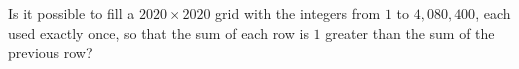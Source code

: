 Is it possible to fill a $2020\times2020$ grid with the integers from $1$ to $4{,}080{,}400$, each used exactly once, so that the sum of each row is $1$ greater than the sum of the previous row?
